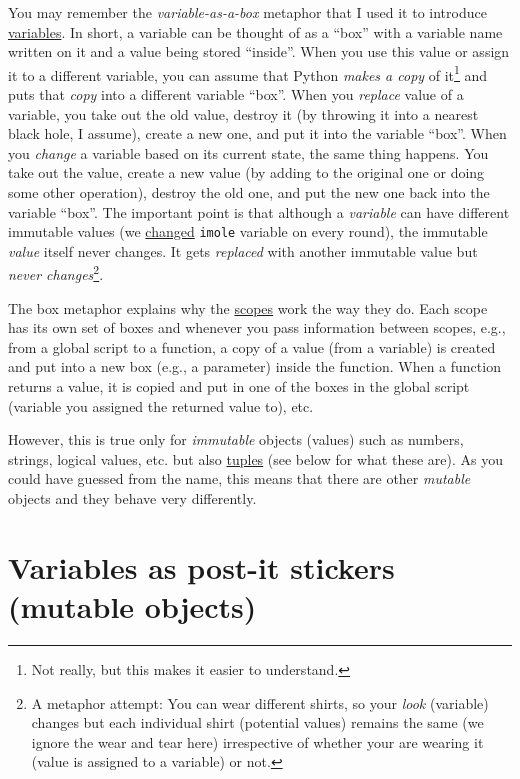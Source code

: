 \documentclass[
]{book}
\begin{document}
You may remember the \emph{variable-as-a-box} metaphor that I used it to introduce \protect\hyperlink{variables}{variables}. In short, a variable can be thought of as a ``box'' with a variable name written on it and a value being stored ``inside''. When you use this value or assign it to a different variable, you can assume that Python \emph{makes a copy} of it\footnote{Not really, but this makes it easier to understand.} and puts that \emph{copy} into a different variable ``box''. When you \emph{replace} value of a variable, you take out the old value, destroy it (by throwing it into a nearest black hole, I assume), create a new one, and put it into the variable ``box''. When you \emph{change} a variable based on its current state, the same thing happens. You take out the value, create a new value (by adding to the original one or doing some other operation), destroy the old one, and put the new one back into the variable ``box''. The important point is that although a \emph{variable} can have different immutable values (we \protect\hyperlink{random-mole}{changed} \texttt{imole} variable on every round), the immutable \emph{value} itself never changes. It gets \emph{replaced} with another immutable value but \emph{never changes}\footnote{A metaphor attempt: You can wear different shirts, so your \emph{look} (variable) changes but each individual shirt (potential values) remains the same (we ignore the wear and tear here) irrespective of whether your are wearing it (value is assigned to a variable) or not.}.

The box metaphor explains why the \protect\hyperlink{scopes-for-immutable-values}{scopes} work the way they do. Each scope has its own set of boxes and whenever you pass information between scopes, e.g., from a global script to a function, a copy of a value (from a variable) is created and put into a new box (e.g., a parameter) inside the function. When a function returns a value, it is copied and put in one of the boxes in the global script (variable you assigned the returned value to), etc.

However, this is true only for \emph{immutable} objects (values) such as numbers, strings, logical values, etc. but also \href{https://docs.python.org/3/library/stdtypes.html?highlight=tuple\#tuple}{tuples} (see below for what these are). As you could have guessed from the name, this means that there are other \emph{mutable} objects and they behave very differently.

\hypertarget{mutable-objects}{%
\section{Variables as post-it stickers (mutable objects)}\label{mutable-objects}}
\end{document}
